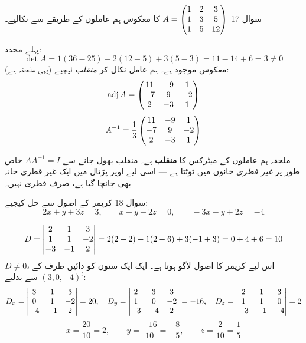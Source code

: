 \begin{sawal}{سوال \textenglish{17}}
\(A=\begin{pmatrix}1&2&3\\1&3&5\\1&5&12\end{pmatrix}\) کا معکوس ہم عاملوں کے طریقے سے نکالیے۔
\end{sawal}

\begin{hal}
پہلے محدد:
\[
\det A=1(36-25)-2(12-5)+3(5-3)=11-14+6=3 \neq 0
\]
معکوس موجود ہے۔ ہم عامل نکال کر \emph{منقلب} لیجیے (یہی ملحقہ ہے):
\[
\operatorname{adj}A=\begin{pmatrix}11&-9&1\\-7&9&-2\\2&-3&1\end{pmatrix}
\]
\[
A^{-1}=\frac{1}{3}\begin{pmatrix}11&-9&1\\-7&9&-2\\2&-3&1\end{pmatrix}
\]

\end{hal}

\begin{ghalti}
ملحقہ ہم عاملوں کے میٹرکس کا \textbf{منقلب} ہے۔ منقلب بھول جانے سے
\(AA^{-1}=I\) خاص طور پر \emph{غیر قطری} خانوں میں ٹوٹتا ہے --- اسی لیے اوپر
پڑتال میں ایک غیر قطری خانہ بھی جانچا گیا ہے، صرف قطری نہیں۔
\end{ghalti}

\begin{sawal}{سوال \textenglish{18}}
کریمر کے اصول سے حل کیجیے:
\[
2x+y+3z=3,\qquad x+y-2z=0,\qquad -3x-y+2z=-4
\]
\end{sawal}

\begin{hal}
\[
D=\begin{vmatrix}2&1&3\\1&1&-2\\-3&-1&2\end{vmatrix}=2(2-2)-1(2-6)+3(-1+3)=0+4+6=10
\]
\(D\neq 0\)، اس لیے کریمر کا اصول لاگو ہوتا ہے۔ ایک ایک ستون کو دائیں طرف کے
\((3,0,-4)^{t}\) سے بدلیے:
\[
D_x=\begin{vmatrix}3&1&3\\0&1&-2\\-4&-1&2\end{vmatrix}=20,\quad
D_y=\begin{vmatrix}2&3&3\\1&0&-2\\-3&-4&2\end{vmatrix}=-16,\quad
D_z=\begin{vmatrix}2&1&3\\1&1&0\\-3&-1&-4\end{vmatrix}=2
\]
\[
x=\frac{20}{10}=2,\qquad
y=\frac{-16}{10}=-\frac85,\qquad
z=\frac{2}{10}=\frac15
\]

\end{hal}

